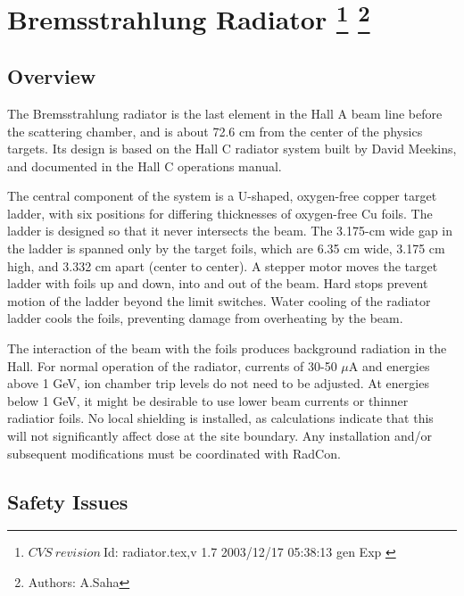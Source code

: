 \section[Bremsstrahlung Radiator]{Bremsstrahlung Radiator
\footnote{
  $CVS~revision~ $Id: radiator.tex,v 1.7 2003/12/17 05:38:13 gen Exp $ $
}
\footnote{Authors: A.Saha }
}

\subsection{Overview}

The Bremsstrahlung radiator is the last element in the Hall A beam line 
before the scattering chamber, and is about 72.6 cm from the center 
of the physics targets.
Its design is based on the Hall C radiator 
system built by David Meekins, and documented in the Hall C operations
manual.

The central component of the system is a U-shaped, oxygen-free copper target
ladder, with six positions for differing thicknesses of oxygen-free Cu foils.
The ladder is designed so that it never intersects the beam.
The 3.175-cm wide gap in the ladder is spanned only by 
the target foils, which are 6.35 cm wide, 3.175 cm high,
and 3.332 cm apart (center to center).
A stepper motor moves the target ladder with foils up and down,
into and out of the beam.
Hard stops prevent motion of the ladder beyond the limit switches.
Water cooling of the radiator ladder cools the foils, preventing
damage from overheating by the beam.

The interaction of the beam with the foils produces
background radiation in the Hall.
For normal operation of the radiator, currents of 30-50 $\mu$A and energies 
above 1 GeV, ion chamber trip levels do not need to be adjusted. At energies 
below 1 GeV, it might be desirable to use lower beam currents or thinner 
radiatior foils. 
No local shielding is installed, as calculations indicate
that this will not significantly affect dose at the site boundary.
Any installation and/or subsequent modifications must be coordinated
with RadCon.

\begin{safetyen}{10}{10}
\subsection{Safety Issues}
\end{safetyen}

